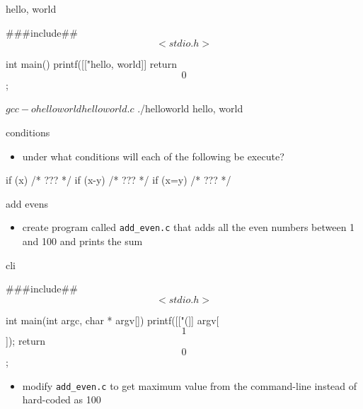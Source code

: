 \documentclass[10pt,t]{beamer}
\begin{document}
  \begin{frame}[fragile]{hello, world}
    \begin{codeblock}
    ###include## $$<stdio.h>$$

    int main() {
      printf([["hello, world]]%
      return $$0$$;
    }
    \end{codeblock}

    \begin{termblock}
    $ gcc -o helloworld helloworld.c
    $ ./helloworld
    hello, world
    \end{termblock}

  \end{frame}

  \begin{frame}[fragile]{conditions}
    \begin{itemize}
      \item under what conditions will each of the following be execute?
    \end{itemize}
    \begin{codeblock}
    if (x) {
      /* ??? */
    }
    if (x-y) {
      /* ??? */
    }
    if (x=y) {
      /* ??? */
    }
    \end{codeblock}

  \end{frame}

  \begin{frame}{add evens}
    \begin{itemize}
      \item create program called \texttt{add\_even.c} that adds all the even
        numbers between 1 and 100 and prints the sum
    \end{itemize}
  \end{frame}

  \begin{frame}[fragile]{cli}
    \begin{codeblock}
    ###include## $$<stdio.h>$$

    int main(int argc, char * argv[]) {
      printf([["(]]%
        argv[$$1$$]);
      return $$0$$;
    }
    \end{codeblock}

    \begin{itemize}
      \item modify \texttt{add\_even.c} to get maximum value from the
        command-line instead of hard-coded as 100
    \end{itemize}
  \end{frame}
\end{document}

